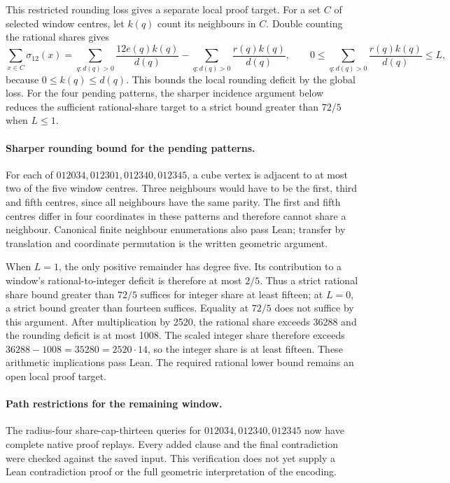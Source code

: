 \documentclass[11pt,a4paper]{article}
\theoremstyle{definition}
\theoremstyle{remark}
\begin{document}
This restricted rounding loss gives a separate local proof target.
For a set $C$ of selected window centres, let $k(q)$ count its neighbours
in $C$. Double counting the rational shares gives
\[
\sum_{x\in C}\sigma_{12}(x)
=\sum_{q:d(q)>0}\frac{12e(q)k(q)}{d(q)}
-\sum_{q:d(q)>0}\frac{r(q)k(q)}{d(q)},
\qquad
0\le\sum_{q:d(q)>0}\frac{r(q)k(q)}{d(q)}\le L,
\]
because $0\le k(q)\le d(q)$. This bounds the local rounding deficit
by the global loss. For the four pending patterns, the sharper
incidence argument below reduces the sufficient rational-share
target to a strict bound greater than $72/5$ when $L\le1$.

\paragraph{Sharper rounding bound for the pending patterns.}
For each of $012034,012301,012340,012345$, a cube vertex is adjacent to
at most two of the five window centres. Three neighbours would have to
be the first, third and fifth centres, since all neighbours have the same
parity. The first and fifth centres differ in four coordinates in these
patterns and therefore cannot share a neighbour. Canonical finite
neighbour enumerations also pass Lean; transfer by translation and
coordinate permutation is the written geometric argument.

When $L=1$, the only positive remainder has degree five. Its contribution
to a window's rational-to-integer deficit is therefore at most $2/5$.
Thus a strict rational share bound greater than $72/5$ suffices for
integer share at least fifteen; at $L=0$, a strict bound greater than
fourteen suffices. Equality at $72/5$ does not suffice by this argument.
After multiplication by 2520, the rational share exceeds 36288 and the
rounding deficit is at most 1008. The scaled integer share therefore
exceeds $36288-1008=35280=2520\cdot14$, so the integer share is at least
fifteen. These arithmetic implications pass Lean.
The required rational lower bound remains an open local proof target.

\paragraph{Path restrictions for the remaining window.}
The radius-four share-cap-thirteen queries for $012034,012340,012345$
now have complete native proof replays. Every added clause and the final
contradiction were checked against the saved input. This verification
does not yet supply a Lean contradiction proof or the full geometric
interpretation of the encoding.
\end{document}
